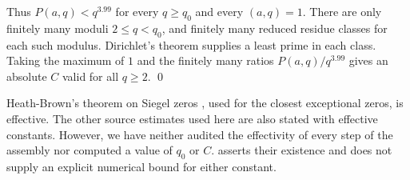 Thus $P(a,q)<q^{3.99}$ for every $q\ge q_0$ and every $(a,q)=1$.
There are only finitely many moduli $2\le q<q_0$, and finitely many reduced residue
classes for each such modulus. Dirichlet's theorem supplies a least prime in each
class. Taking the maximum of $1$ and the finitely many ratios $P(a,q)/q^{3.99}$ gives
an absolute $C$ valid for all $q\ge2$. \qed

\begin{remark}[Effectivity]
Heath-Brown's theorem on Siegel zeros \cite[Corollary~1]{HeathBrown1990siegel}, used for
the closest exceptional zeros, is effective. The other source estimates used here are
also stated with effective constants. However, we have neither audited the effectivity
of every step of the assembly nor computed a value of $q_0$ or $C$.
 asserts their existence and does not supply an explicit numerical bound
for either constant.
\end{remark}

